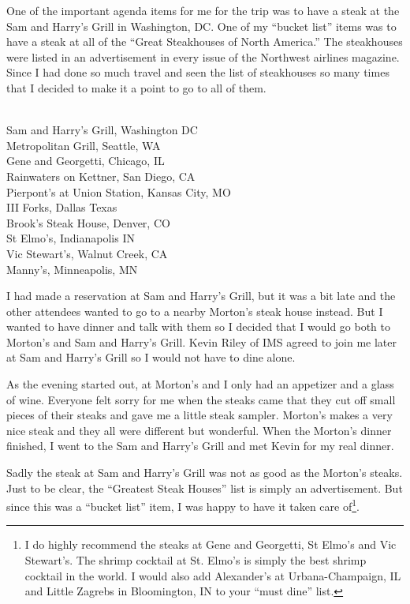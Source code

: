 \documentclass[12pt]{book}
\begin{document}
One of the important agenda items for me for the trip was to
have a steak at the Sam and Harry's Grill in Washington, DC.
One of my ``bucket list'' items was to have a steak at all
of the ``Great Steakhouses of North America.''  The
steakhouses were listed in an advertisement in every issue
of the Northwest airlines magazine.   Since I had done
so much travel
and seen the list of steakhouses so many times that
I decided to make it a point to go to all of them.\\
\\
\begin{sf}
Sam and Harry's Grill, Washington DC\\
Metropolitan Grill, Seattle, WA\\
Gene and Georgetti, Chicago, IL\\
Rainwaters on Kettner, San Diego, CA \\
Pierpont's at Union Station, Kansas City, MO\\
III Forks, Dallas Texas\\
Brook's Steak House, Denver, CO\\
St Elmo's, Indianapolis IN\\
Vic Stewart's, Walnut Creek, CA\\
Manny's, Minneapolis, MN \\
\end{sf}

I had made a reservation at Sam and Harry's Grill, but it was a bit late
and the other attendees wanted to go to a nearby Morton's
steak house instead.  But I wanted to have dinner and
talk with them so I decided that I would go both to Morton's
and Sam and Harry's Grill.  Kevin Riley of IMS agreed to join me
later at Sam and Harry's Grill so I would not have to dine alone.

As the evening started out, at Morton's and I only had
an appetizer and a glass of wine.   Everyone felt
sorry for me when the steaks came that they cut off
small pieces of their steaks and gave me a little
steak sampler.  Morton's makes a very nice steak and they
all were different but wonderful.  When the Morton's dinner
finished, I went to the Sam and Harry's Grill and met Kevin for
my real dinner.

Sadly the steak at Sam and Harry's Grill was not as good as the
Morton's steaks.  Just to be clear, the ``Greatest Steak
Houses'' list is simply an advertisement.   But since
this was a ``bucket list'' item, I was happy
to have it taken care of\footnote{I do highly recommend the steaks at
Gene and Georgetti, St Elmo's and Vic Stewart's.
The shrimp cocktail at St. Elmo's is simply the best
shrimp cocktail in the world.
I would also add
Alexander's at Urbana-Champaign, IL and Little Zagrebs in Bloomington, IN
to your ``must dine'' list.}.
\end{document}
